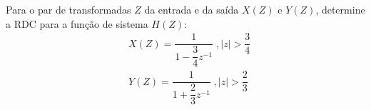 \documentclass[12pt,a4paper]{article}
\begin{document}
\problem Para o par de transformadas $Z$ da
entrada e da saída $X(Z)$ e $Y(Z)$, determine a RDC para a função de sistema $H(Z)$:
 \begin{equation*}
\begin{split}
    &X(Z) = \dfrac{1}{1 - \dfrac{3}{4}z^{-1}}\; , |z| > \dfrac{3}{4}\\
    &Y(Z) = \dfrac{1}{1 + \dfrac{2}{3}z^{-1}}\; , |z| > \dfrac{2}{3}
\end{split}
\end{equation*}

\end{document}
